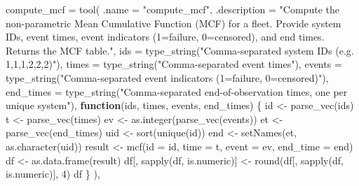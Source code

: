 \documentclass[
  letterpaper,
  DIV=11,
  numbers=noendperiod]{scrreprt}
\newenvironment{Shaded}{\begin{snugshade}}{\end{snugshade}}
\newcommand{\AttributeTok}[1]{\textcolor[rgb]{0.40,0.45,0.13}{#1}}
\newcommand{\ControlFlowTok}[1]{\textcolor[rgb]{0.00,0.23,0.31}{\textbf{#1}}}
\newcommand{\DecValTok}[1]{\textcolor[rgb]{0.68,0.00,0.00}{#1}}
\newcommand{\FunctionTok}[1]{\textcolor[rgb]{0.28,0.35,0.67}{#1}}
\newcommand{\NormalTok}[1]{\textcolor[rgb]{0.00,0.23,0.31}{#1}}
\newcommand{\OtherTok}[1]{\textcolor[rgb]{0.00,0.23,0.31}{#1}}
\newcommand{\StringTok}[1]{\textcolor[rgb]{0.13,0.47,0.30}{#1}}
\begin{document}
\begin{Shaded}
\begin{Highlighting}[]
    \AttributeTok{compute\_mcf =} \FunctionTok{tool}\NormalTok{(}
      \AttributeTok{.name        =} \StringTok{"compute\_mcf"}\NormalTok{,}
      \AttributeTok{.description =} \StringTok{"Compute the non{-}parametric Mean Cumulative Function (MCF) for a fleet.}
\StringTok{                      Provide system IDs, event times, event indicators (1=failure, 0=censored),}
\StringTok{                      and end times. Returns the MCF table."}\NormalTok{,}
      \AttributeTok{ids        =} \FunctionTok{type\_string}\NormalTok{(}\StringTok{"Comma{-}separated system IDs (e.g. \textquotesingle{}1,1,1,2,2,2\textquotesingle{})"}\NormalTok{),}
      \AttributeTok{times      =} \FunctionTok{type\_string}\NormalTok{(}\StringTok{"Comma{-}separated event times"}\NormalTok{),}
      \AttributeTok{events     =} \FunctionTok{type\_string}\NormalTok{(}\StringTok{"Comma{-}separated event indicators (1=failure, 0=censored)"}\NormalTok{),}
      \AttributeTok{end\_times  =} \FunctionTok{type\_string}\NormalTok{(}\StringTok{"Comma{-}separated end{-}of{-}observation times, one per unique system"}\NormalTok{),}
      \ControlFlowTok{function}\NormalTok{(ids, times, events, end\_times) \{}
\NormalTok{        id  }\OtherTok{\textless{}{-}} \FunctionTok{parse\_vec}\NormalTok{(ids)}
\NormalTok{        t   }\OtherTok{\textless{}{-}} \FunctionTok{parse\_vec}\NormalTok{(times)}
\NormalTok{        ev  }\OtherTok{\textless{}{-}} \FunctionTok{as.integer}\NormalTok{(}\FunctionTok{parse\_vec}\NormalTok{(events))}
\NormalTok{        et  }\OtherTok{\textless{}{-}} \FunctionTok{parse\_vec}\NormalTok{(end\_times)}
\NormalTok{        uid }\OtherTok{\textless{}{-}} \FunctionTok{sort}\NormalTok{(}\FunctionTok{unique}\NormalTok{(id))}
\NormalTok{        end }\OtherTok{\textless{}{-}} \FunctionTok{setNames}\NormalTok{(et, }\FunctionTok{as.character}\NormalTok{(uid))}
\NormalTok{        result }\OtherTok{\textless{}{-}} \FunctionTok{mcf}\NormalTok{(}\AttributeTok{id =}\NormalTok{ id, }\AttributeTok{time =}\NormalTok{ t, }\AttributeTok{event =}\NormalTok{ ev, }\AttributeTok{end\_time =}\NormalTok{ end)}
\NormalTok{        df }\OtherTok{\textless{}{-}} \FunctionTok{as.data.frame}\NormalTok{(result)}
\NormalTok{        df[, }\FunctionTok{sapply}\NormalTok{(df, is.numeric)] }\OtherTok{\textless{}{-}} \FunctionTok{round}\NormalTok{(df[, }\FunctionTok{sapply}\NormalTok{(df, is.numeric)], }\DecValTok{4}\NormalTok{)}
\NormalTok{        df}
\NormalTok{      \}}
\NormalTok{    ),}


\end{Highlighting}
\end{Shaded}
\end{document}
